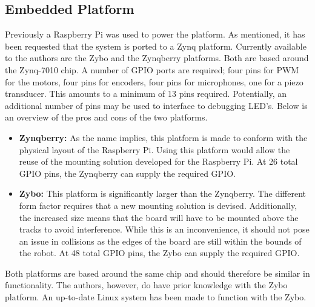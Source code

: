 \documentclass[11pt]{article}
\begin{document}
\subsection{Embedded Platform} %
\label{sub:embedded_platform}
Previously a Raspberry Pi was used to power the platform.
As mentioned, it has been requested that the system is ported to a Zynq platform.
Currently available to the authors are the Zybo and the Zynqberry platforms.
Both are based around the Zynq-7010 chip.
A number of GPIO ports are required; four pins for PWM for the motors, four pins for encoders, four pins for microphones, one for a piezo transducer.
This amounts to a minimum of 13 pins required.
Potentially, an additional number of pins may be used to interface to debugging LED's.  
Below is an overview of the pros and cons of the two platforms.
\begin{itemize}
	\item \textbf{Zynqberry:} As the name implies, this platform is made to conform with the physical layout of the Raspberry Pi.
	Using this platform would allow the reuse of the mounting solution developed for the Raspberry Pi.
	At 26 total GPIO pins, the Zynqberry can supply the required GPIO.
	\item \textbf{Zybo:} This platform is significantly larger than the Zynqberry.
	The different form factor requires that a new mounting solution is devised.
	Additionally, the increased size means that the board will have to be mounted above the tracks to avoid interference.
	While this is an inconvenience, it should not pose an issue in collisions as the edges of the board are still within the bounds of the robot.  
	At 48 total GPIO pins, the Zybo can supply the required GPIO.
\end{itemize}
Both platforms are based around the same chip and should therefore be similar in functionality. The authors, however, do have prior knowledge with the Zybo platform.
An up-to-date Linux system has been made to function with the Zybo.

\end{document}

